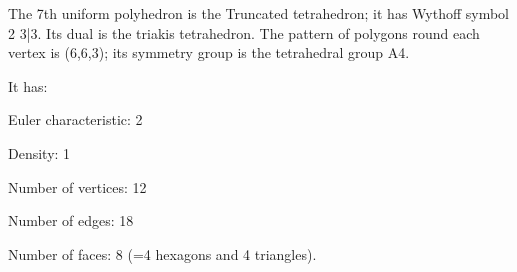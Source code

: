 The 7th uniform polyhedron is the Truncated tetrahedron; 
it has Wythoff symbol 2 3|3. Its dual is the triakis tetrahedron. The pattern of polygons round each vertex is (6,6,3); its symmetry group is the tetrahedral group A4.\par
It has:\par
Euler characteristic: 2\par
Density: 1\par
Number of vertices: 12\par
Number of edges:  18\par
Number of faces: 8 (=4 hexagons and 4 triangles).
